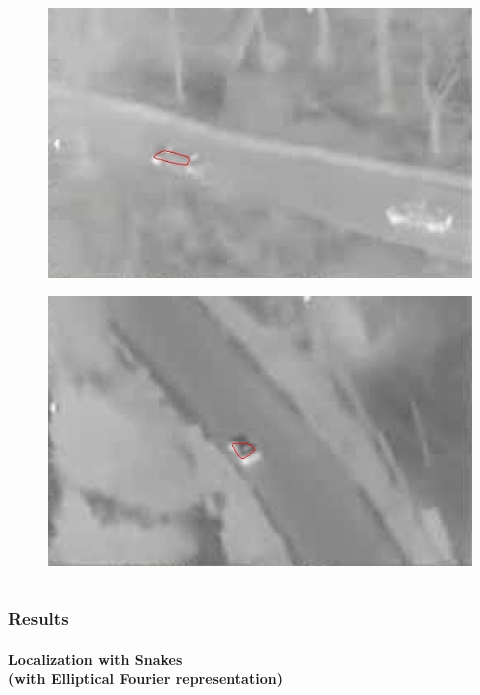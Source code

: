 \begin{frame}
\begin{columns}
\begin{column}{1in}
\begin{figure}
				\includegraphics[width=1.5\textwidth]{figs/TRK_IGARSS2010_00030_contour.jpg}
			\end{figure}
			\begin{figure}
				\includegraphics[width=1.5\textwidth]{figs/TRK_IGARSS2010_01277_contour.jpg}
			\end{figure}
		\end{column}			
	\end{columns}
\end{frame}




\begin{frame}
\frametitle{Results}
\framesubtitle{Localization with Snakes \\{\small(with Elliptical Fourier representation)}}
\logoCSIPCPL\mypagenum
\end{frame}



